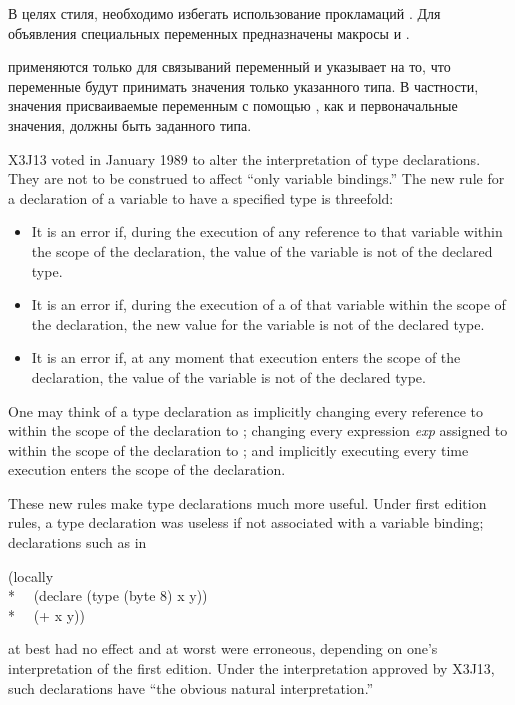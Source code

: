 \begin{flushdesc}
В целях стиля, необходимо избегать использование прокламаций . Для
объявления специальных переменных предназначены макросы  и
.

\item[\cdf{type}]
 применяются только для
связываний переменный и указывает на то, что переменные будут принимать значения
только указанного типа.
В частности, значения присваиваемые переменным с помощью , как и
первоначальные значения, должны быть заданного типа.

\begin{new}
X3J13 voted in January 1989
to alter the interpretation of type declarations.
They are not to be construed to affect ``only variable bindings.''
The new rule for a declaration of a variable to
have a specified type is threefold:
\begin{itemize}
\item It is an error if, during the execution
of any reference to that variable within the scope of the declaration,
the value of the variable is not of the declared type.
\item It is an error if, during the execution
of a  of that variable within the scope of the declaration,
the new value for the variable is not of the declared type.
\item It is an error if, at any moment that execution enters the scope
of the declaration, the value of the variable is not of the
declared type.
\end{itemize}
One may think of a type declaration 
as implicitly changing every reference to  within the scope
of the declaration to ; changing every expression
\emph{exp} assigned to  within the scope of the declaration
to ; and implicitly executing 
every time execution enters the scope of the declaration.

These new rules make type declarations much more useful.  Under first
edition rules, a type declaration was useless if not associated with
a variable binding; declarations such as in
\begin{lisp}
(locally \\*
~~(declare (type (byte 8) x y)) \\*
~~(+ x y))
\end{lisp}
at best had no effect and at worst were erroneous, depending on one's
interpretation of the first edition.  Under the interpretation approved
by X3J13, such declarations have ``the obvious natural interpretation.''


\end{new}
\end{flushdesc}
